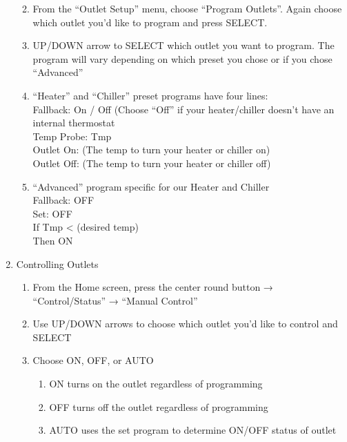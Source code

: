 \documentclass[
]{book}
\providecommand{\tightlist}{%
  \setlength{\itemsep}{0pt}\setlength{\parskip}{0pt}}
\begin{document}
\begin{enumerate}
  \begin{enumerate}
  \def\labelenumii{\arabic{enumii}.}
  \tightlist
  \item
    From the ``Outlet Setup'' menu, choose ``Program Outlets''. Again choose which outlet you'd like to program and press SELECT.\\
  \item
    UP/DOWN arrow to SELECT which outlet you want to program. The program will vary depending on which preset you chose or if you chose ``Advanced''\\
  \item
    ``Heater'' and ``Chiller'' preset programs have four lines:\\
    Fallback: On / Off (Choose ``Off'' if your heater/chiller doesn't have an internal thermostat\\
    Temp Probe: Tmp\\
    Outlet On: (The temp to turn your heater or chiller on)\\
    Outlet Off: (The temp to turn your heater or chiller off)\\
  \item
    ``Advanced'' program specific for our Heater and Chiller\\
    Fallback: OFF\\
    Set: OFF\\
    If Tmp \textless{} (desired temp)\\
    Then ON\\
  \end{enumerate}
\item
  Controlling Outlets

  \begin{enumerate}
  \def\labelenumii{\arabic{enumii}.}
  \tightlist
  \item
    From the Home screen, press the center round button → ``Control/Status'' → ``Manual Control''\\
  \item
    Use UP/DOWN arrows to choose which outlet you'd like to control and SELECT\\
  \item
    Choose ON, OFF, or AUTO

    \begin{enumerate}
    \def\labelenumiii{\arabic{enumiii}.}
    \tightlist
    \item
      ON turns on the outlet regardless of programming\\
    \item
      OFF turns off the outlet regardless of programming\\
    \item
      AUTO uses the set program to determine ON/OFF status of outlet
    \end{enumerate}
  \end{enumerate}
\end{enumerate}
\end{document}
